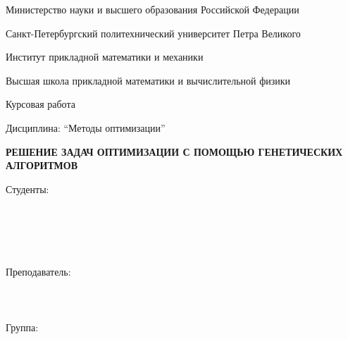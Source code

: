



\thispagestyle{empty}

\begin{center}

\LARGE{Министерство науки и высшего образования Российской Федерации}

\LARGE{Санкт-Петербургский политехнический университет Петра Великого}
\vspace{0.4cm}

Институт прикладной математики и механики

Высшая школа прикладной математики и вычислительной физики
\vspace{3cm}

\LARGE{Курсовая работа}

Дисциплина: ``Методы оптимизации''

\vspace{1.4cm}

\large{\textbf{РЕШЕНИЕ ЗАДАЧ ОПТИМИЗАЦИИ С ПОМОЩЬЮ ГЕНЕТИЧЕСКИХ АЛГОРИТМОВ}}
\end{center}

\vspace{3cm}

\newbox{\lbox}
\newlength{\maxl}
\setlength{\maxl}{\wd\lbox}

\hfill\parbox{11cm}{
Студенты:\\
\hspace*{2cm}{Дамаскинский Константин. Глава 4.1} \\
\hspace*{2cm}{Колесник Виктор. Глава 1}\\
\hspace*{2cm}{Пестряков Данил. Главы 2, 3}\\
\hspace*{2cm}{Рыженко Виктор. Глава 4.2}\\
\\Преподаватель:\\
\hspace*{2cm}{доцент ВШПМиВФ, к.ф.м.н.}\\
\hspace*{2cm}{Родионова Елена Александровна}
\\
\\
\hspace*{5cm}\hspace*{-5cm}Группа:\\
\hspace*{2cm}{3630102/70201}\\
}

